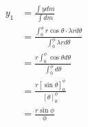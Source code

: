 \documentclass[12pt]{article}
\begin{document}
\begin{align*}
y_1 &= \frac{\int y dm}{\int dm}\\
&= \frac{\int^{\phi}_{0} r\cos\theta \cdot \lambda r d\theta}{\int^{\phi}_{0} \lambda r d\theta}\\
&= \frac{r\int^{\phi}_{0} \cos\theta d\theta}{\int^{\phi}_{0} d\theta}\\
&= \frac{r \left[ \sin\theta\right]^{\phi}_{0}}{\left[ \theta \right]^{\phi}_{0}}\\
&= \frac{r \sin\phi}{\phi}
\end{align*}
\end{document}
